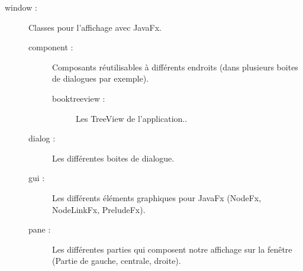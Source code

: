 \begin{description}
			\item[window :]{Classes pour l'affichage avec JavaFx.}
			\begin{description}
				\item[component :]{Composants réutilisables à différents endroits (dans plusieurs boites de dialogues par exemple).}
				\begin{description}
					\item[booktreeview :]{Les TreeView de l'application..}
				\end{description}
				\item[dialog :]{Les différentes boites de dialogue.}
				\item[gui :]{Les différents éléments graphiques pour JavaFx (NodeFx, NodeLinkFx, PreludeFx).}
				\item[pane :]{Les différentes parties qui composent notre affichage sur la fenêtre (Partie de gauche, centrale, droite).}
			\end{description}
		\end{description}
